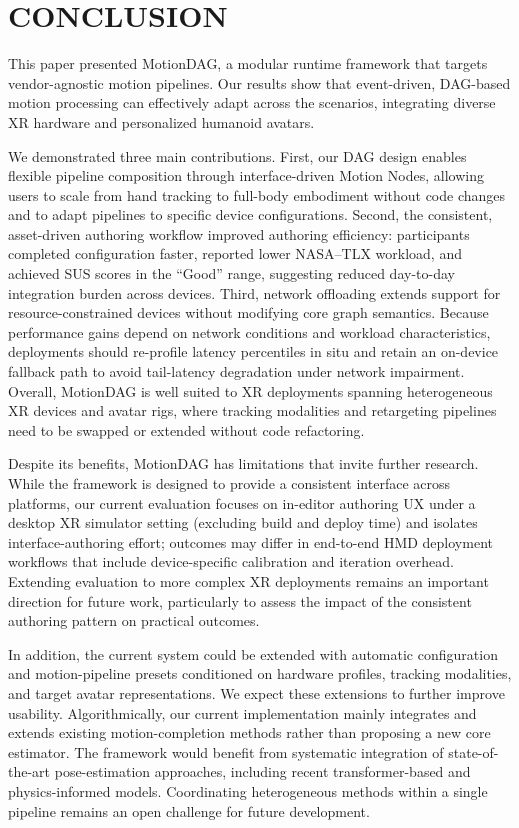 \section{CONCLUSION}
\label{sec:discussionandconclusion}

This paper presented MotionDAG, a modular runtime framework that targets vendor-agnostic motion pipelines.
Our results show that event-driven, DAG-based motion processing can effectively adapt across the scenarios, integrating diverse XR hardware and personalized humanoid avatars.

We demonstrated three main contributions.
First, our DAG design enables flexible pipeline composition through interface-driven Motion Nodes, allowing users to scale from hand tracking to full-body embodiment without code changes and to adapt pipelines to specific device configurations.
Second, the consistent, asset-driven authoring workflow improved authoring efficiency: participants completed configuration faster, reported lower NASA--TLX workload, and achieved SUS scores in the ``Good'' range, suggesting reduced day-to-day integration burden across devices.
Third, network offloading extends support for resource-constrained devices without modifying core graph semantics.
Because performance gains depend on network conditions and workload characteristics, deployments should re-profile latency percentiles in situ and retain an on-device fallback path to avoid tail-latency degradation under network impairment.
Overall, MotionDAG is well suited to XR deployments spanning heterogeneous XR devices and avatar rigs, where tracking modalities and retargeting pipelines need to be swapped or extended without code refactoring.

Despite its benefits, MotionDAG has limitations that invite further research.
While the framework is designed to provide a consistent interface across platforms, our current evaluation focuses on in-editor authoring UX under a desktop XR simulator setting (excluding build and deploy time) and isolates interface-authoring effort; outcomes may differ in end-to-end HMD deployment workflows that include device-specific calibration and iteration overhead.
Extending evaluation to more complex XR deployments remains an important direction for future work, particularly to assess the impact of the consistent authoring pattern on practical outcomes.

In addition, the current system could be extended with automatic configuration and motion-pipeline presets conditioned on hardware profiles, tracking modalities, and target avatar representations. We expect these extensions to further improve usability.
Algorithmically, our current implementation mainly integrates and extends existing motion-completion methods rather than proposing a new core estimator. The framework would benefit from systematic integration of state-of-the-art pose-estimation approaches, including recent transformer-based and physics-informed models. 
Coordinating heterogeneous methods within a single pipeline remains an open challenge for future development.